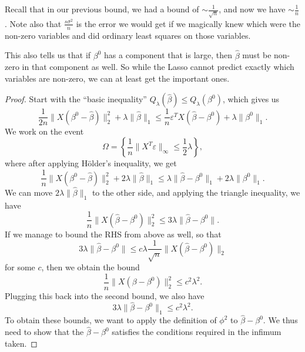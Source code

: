 \documentclass[a4paper]{article}
\begin{document}
Recall that in our previous bound, we had a bound of $\sim \frac{1}{\sqrt{n}}$, and now we have $\sim \frac{1}{n}$. Note also that $\frac{s \sigma^2}{n}$ is the error we would get if we magically knew which were the non-zero variables and did ordinary least squares on those variables.

This also tells us that if $\beta^0$ has a component that is large, then $\hat{\beta}$ must be non-zero in that component as well. So while the Lasso cannot predict exactly which variables are non-zero, we can at least get the important ones.

\begin{proof}
  Start with the ``basic inequality'' $Q_\lambda(\hat{\beta}) \leq Q_\lambda(\beta^0)$, which gives us
  \[
    \frac{1}{2n} \|X (\beta^0 - \hat{\beta})\|_2^2 + \lambda \|\hat{\beta}\|_1 \leq \frac{1}{n} \varepsilon^T X(\hat{\beta} - \beta^0) + \lambda \|\beta^0\|_1.
  \]
  We work on the event
  \[
    \Omega = \left\{\frac{1}{n} \|X^T \varepsilon \|_\infty \leq \frac{1}{2} \lambda\right\},
  \]
  where after applying H\"older's inequality, we get
  \[
    \frac{1}{n} \|X(\beta^0 - \hat{\beta})\|_2^2 + 2 \lambda \|\hat{\beta}\|_1 \leq \lambda \|\hat{\beta} - \beta^0\|_1 + 2 \lambda \|\beta^0\|_1.
  \]
  We can move $2 \lambda \|\hat{\beta}\|_1$ to the other side, and applying the triangle inequality, we have
  \[
    \frac{1}{n} \|X(\hat{\beta} - \beta^0)\|_2^2 \leq 3 \lambda \|\hat{\beta} - \beta^0\|.
  \]
  If we manage to bound the RHS from above as well, so that
  \[
    3\lambda \|\hat{\beta} - \beta^0\| \leq c \lambda \frac{1}{\sqrt{n}} \|X (\hat{\beta} - \beta^0)\|_2
  \]
  for some $c$, then we obtain the bound
  \[
    \frac{1}{n} \|X (\beta - \beta^0)\|_2^2 \leq c^2 \lambda^2.
  \]
  Plugging this back into the second bound, we also have
  \[
    3 \lambda \|\hat{\beta} - \beta^0\|_1 \leq c^2 \lambda^2.
  \]
  To obtain these bounds, we want to apply the definition of $\phi^2$ to $\hat{\beta} - \beta^0$. We thus need to show that the $\hat{\beta} - \beta^0$ satisfies the conditions required in the infimum taken.


\end{proof}
\end{document}

